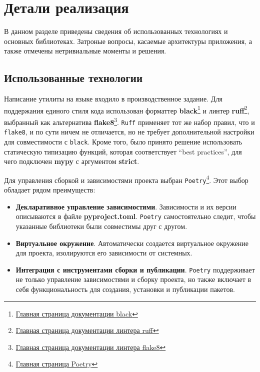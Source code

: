 
\section{Детали реализация}
В данном разделе приведены сведения об использованных технологиях и основных библиотеках.
Затроные вопросы, касаемые архитектуры приложения, а также отмечены нетривиальные моменты и решения.

\subsection{Использованные технологии}
Написание утилиты на языке {\python} входило в производственное задание.
Для поддержания единого стиля кода использован форматтер \textbf{black}\footnote{\href{https://black.readthedocs.io/en/stable/}{Главная страница документации black}} и линтер \textbf{ruff}\footnote{\href{https://docs.astral.sh/ruff/}{Главная страница документации линтера ruff}}, выбранный как альтернатива \textbf{flake8}\footnote{\href{https://flake8.pycqa.org/en/latest/}{Главная страница документации линтера flake8}}.
\texttt{Ruff} применяет тот же набор правил, что и \texttt{flake8}, и по сути ничем не отличается, но не требует дополнительной настройки для совместимости с \texttt{black}.
Кроме того, было принято решение использовать статическую типизацию функций, которая соответствует \enquote{best practices}, для чего подключен \textbf{mypy} с аргументом \textbf{strict}.

Для управления сборкой и зависимостями проекта выбран \texttt{Poetry}\footnote{\href{https://python-poetry.org/}{Главная страница Poetry}}. Этот выбор обладает рядом преимуществ:
\begin{itemize}
	\item \textbf{Декларативное управление зависимостями}. Зависимости и их версии описываются в файле \textbf{pyproject.toml}. \texttt{Poetry} самостоятельно следит, чтобы указанные библиотеки были совместимы друг с другом.
	\item \textbf{Виртуальное окружение}. Автоматически создается виртуальное окружение для проекта, изолируются его зависимости от системных.
	\item \textbf{Интеграция с инструментами сборки и публикации}. \texttt{Poetry} поддерживает не только управление зависимостями и сборку проекта, но также включает в себя функциональность для создания, установки и публикации пакетов.
\end{itemize}

